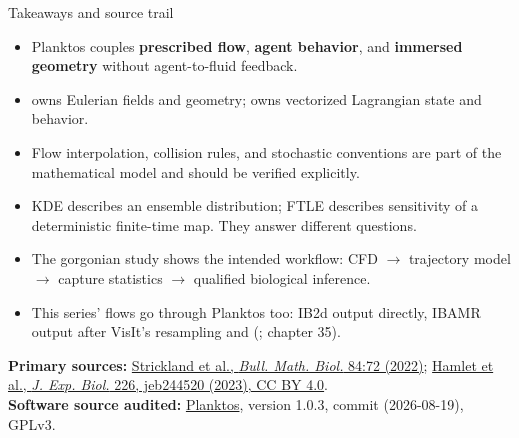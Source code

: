 \documentclass[aspectratio=169,11pt]{beamer}
\begin{document}
\begin{frame}{Takeaways and source trail}
\begin{itemize}
  \item Planktos couples \textbf{prescribed flow}, \textbf{agent behavior}, and \textbf{immersed geometry} without agent-to-fluid feedback.
  \item {} owns Eulerian fields and geometry;  owns vectorized Lagrangian state and behavior.
  \item Flow interpolation, collision rules, and stochastic conventions are part of the mathematical model and should be verified explicitly.
  \item KDE describes an ensemble distribution; FTLE describes sensitivity of a deterministic finite-time map. They answer different questions.
  \item The gorgonian study shows the intended workflow: CFD $\rightarrow$ trajectory model $\rightarrow$ capture statistics $\rightarrow$ qualified biological inference.
  \item This series' flows go through Planktos too: IB2d output directly, IBAMR output after VisIt's resampling and  (; chapter 35).
\end{itemize}
\vspace{0.3em}
{\scriptsize
\textbf{Primary sources:}
\href{https://doi.org/10.1007/s11538-022-01027-1}{Strickland et al., \emph{Bull. Math. Biol.} 84:72 (2022)};
\href{https://doi.org/10.1242/jeb.244520}{Hamlet et al., \emph{J. Exp. Biol.} 226, jeb244520 (2023), CC BY 4.0}.\\[2pt]
\textbf{Software source audited:}
\href{https://github.com/mountaindust/Planktos}{Planktos}, version 1.0.3, commit  (2026-08-19), GPLv3.
}
\end{frame}
\end{document}
